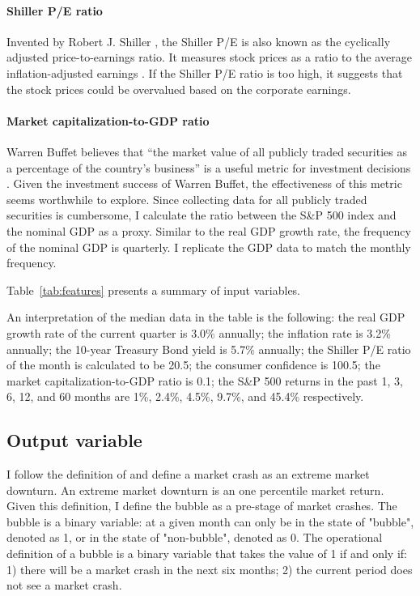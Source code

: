\documentclass[12pt, man, a4paper, floatsintext]{apa7}
\begin{document}
\paragraph{Shiller P/E ratio} Invented by Robert J. Shiller \parencite{shiller2015IE}, the Shiller P/E is also known as the cyclically adjusted price-to-earnings ratio. It measures stock prices as a ratio to the average inflation-adjusted earnings \parencite{shillerPE}. If the Shiller P/E ratio is too high, it suggests that the stock prices could be overvalued based on the corporate earnings. 

\paragraph{Market capitalization-to-GDP ratio} Warren Buffet believes that “the market value of all publicly traded securities as a percentage of the country's business” is a useful metric for investment decisions \parencite{buffett}. Given the investment success of Warren Buffet, the effectiveness of this metric seems worthwhile to explore. Since collecting data for all publicly traded securities is cumbersome, I calculate the ratio between the S\&P 500 index and the nominal GDP as a proxy. Similar to the real GDP growth rate, the frequency of the nominal GDP is quarterly. I replicate the GDP data to match the monthly frequency.

Table~\ref{tab:features} presents a summary of input variables.



An interpretation of the median data in the table is the following: the real GDP growth rate of the current quarter is 3.0\% annually; the inflation rate is 3.2\% annually; the 10-year Treasury Bond yield is 5.7\% annually; the Shiller P/E ratio of the month is calculated to be 20.5; the consumer confidence is 100.5; the market capitalization-to-GDP ratio is 0.1; the S\&P 500 returns in the past 1, 3, 6, 12, and 60 months are 1\%, 2.4\%, 4.5\%, 9.7\%, and 45.4\% respectively. 

\subsection{Output variable}

I follow the definition of \textcite{Chat2018} and define a market crash as an extreme market downturn. An extreme market downturn is an one percentile market return. Given this definition, I define the bubble as a pre-stage of market crashes. The bubble is a binary variable: at a given month can only be in the state of "bubble", denoted as 1, or in the state of "non-bubble", denoted as 0. The operational definition of a bubble is a binary variable that takes the value of 1 if and only if: 1) there will be a market crash in the next six months; 2) the current period does not see a market crash. 
\end{document}
